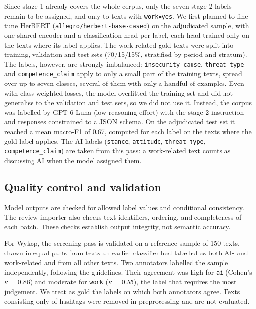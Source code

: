\documentclass[11pt]{article}
\begin{document}
Since stage 1 already covers the
whole corpus, only the seven stage 2 labels remain to be assigned, and only to
texts with \texttt{work=yes}. We first planned to fine-tune HerBERT
(\texttt{allegro/herbert-base-cased}) on the adjudicated sample, with one
shared encoder and a classification head per label, each head trained only on
the texts where its label applies. The work-related gold texts were split
into training, validation and test sets (70/15/15\%, stratified by period and stratum). The labels, however, are
strongly imbalanced: \texttt{insecurity\_cause}, \texttt{threat\_type} and
\texttt{competence\_claim} apply to only a small part of the training texts,
spread over up to seven classes, several of them with only a handful of
examples. Even with class-weighted losses, the model overfitted the training
set and did not generalise to the validation and test sets, so we did not use
it. Instead, the corpus was labelled by GPT-6 Luna (low reasoning effort) with
the stage 2 instruction and responses constrained to a JSON schema. On the
adjudicated test set it reached a mean macro-F1 of 0.67, computed for each
label on the texts where the gold label applies. The AI labels
(\texttt{stance}, \texttt{attitude}, \texttt{threat\_type},
\texttt{competence\_claim}) are taken from this pass: a work-related text
counts as discussing AI when the model assigned them.

\subsection{Quality control and validation}

Model outputs are checked for allowed label values and
conditional consistency. The review importer also
checks text identifiers, ordering, and completeness of each batch.
These checks establish output integrity, not semantic accuracy.

For Wykop, the screening pass is validated on a reference sample of 150
texts, drawn in equal parts from texts an earlier classifier had labelled
as both AI- and work-related and from all other texts. Two annotators
labelled the sample independently, following the guidelines. Their
agreement was high for \texttt{ai} (Cohen's $\kappa = 0.86$) and moderate
for \texttt{work} ($\kappa = 0.55$), the label that requires the most
judgement. We treat as gold the labels on which both annotators agree.
Texts consisting only of hashtags were removed in preprocessing and are
not evaluated.
\end{document}
